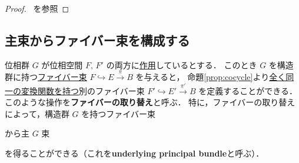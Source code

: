 \documentclass[algtopo_main]{subfiles}
\begin{document}
\begin{proof}
    ~\cite[p.88 Theorem 5.8.]{Bredon}を参照
\end{proof}

\subsection{主束からファイバー束を構成する}

位相群 $G$ が位相空間 $F,\, F'$ の両方に\hyperref[def:TG-action]{作用}しているとする．
このとき $G$ を構造群に持つ\hyperref[def:FB]{ファイバー束} $F \hookrightarrow E \xrightarrow{\pi} B$ を与えると，
命題\ref{prop:cocycle}より\underline{全く同一の変換関数を持つ}別のファイバー束 $F' \hookrightarrow E' \xrightarrow{\pi'} B$ を定義することができる．
このような操作を\textbf{ファイバーの取り替え}と呼ぶ．
特に，ファイバーの取り替えによって，構造群 $G$ を持つファイバー束
\begin{figure}[H]
    \centering
\end{figure}%
から主 $G$ 束
\begin{figure}[H]
    \centering
\end{figure}%
を得ることができる（これを\textbf{underlying principal bundle}と呼ぶ）．
\end{document}
